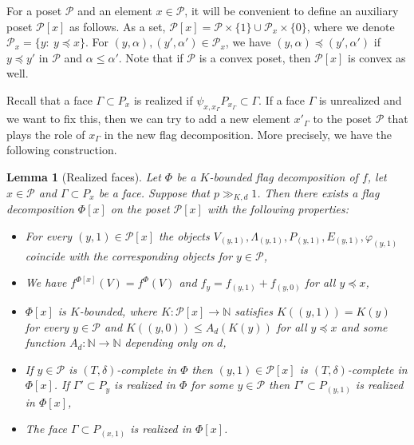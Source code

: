 \documentclass{daj}
\renewcommand{\le}{\leqslant}
\newcommand{\N}{\mathbb N}
\renewcommand{\P}{\mathcal P}
\newtheorem{lemma}[theorem]{Lemma}
\theoremstyle{definition}
\theoremstyle{remark}
\theoremstyle{definition}
\theoremstyle{definition}
\begin{document}
For a poset $\P$ and an element $x \in \P$, it will be convenient to define an auxiliary poset $\P[x]$ as follows. As a set, $\P[x] = \P \times \{1\} \cup \P_x \times \{0\}$, where we denote $\P_x = \{y: ~y \preceq x\}$. For $(y, \alpha), (y', \alpha') \in \P_x$, we have $(y, \alpha) \preceq (y', \alpha')$ if $y \preceq y'$ in $\P$ and $\alpha \le \alpha'$. Note that if $\P$ is a convex poset, then $\P[x]$ is convex as well. 





Recall that a face $\Gamma \subset P_x$ is realized if $\psi_{x, x_\Gamma} P_{x_\Gamma} \subset \Gamma$. If a face $\Gamma$ is unrealized and we want to fix this, then we can try to add a new element $x'_\Gamma$ to the poset $\P$ that plays the role of $x_\Gamma$ in the new flag decomposition. More precisely, we have the following construction.

\begin{lemma}[Realized faces]\label{oper1}
Let $\Phi$ be a $K$-bounded flag decomposition of $f$, let $x \in \P$ and $\Gamma \subset P_x$ be a face. Suppose that $p \gg_{K, d} 1$.
Then there exists a flag decomposition $\Phi[x]$ on the poset $\P[x]$ with the following properties:
\begin{itemize}
    \item For every $(y, 1) \in \P[x]$ the objects $V_{(y, 1)}, \Lambda_{(y, 1)}, P_{(y, 1)}, E_{(y, 1)}, \varphi_{(y, 1)}$ coincide with the corresponding objects for $y \in \P$,
    \item We have $f^{\Phi[x]}(V) = f^\Phi(V)$ and $f_y = f_{(y, 1)} + f_{(y, 0)}$ for all $y \preceq x$, 
    \item $\Phi[x]$ is $K$-bounded, where $K: \P[x] \rightarrow \N$ satisfies $K((y, 1)) = K(y)$ for every $y \in \P$ and $K((y, 0)) \le A_d(K(y))$ for all $y \preceq x$ and some function $A_d: \N\rightarrow \N$ depending only on $d$,
    \item If $y \in \P$ is $(T, \delta)$-complete in $\Phi$ then $(y, 1) \in \P[x]$ is $(T, \delta)$-complete in $\Phi[x]$. If $\Gamma' \subset P_y$ is realized in $\Phi$ for some $y \in \P$ then $\Gamma' \subset P_{(y, 1)}$ is realized in  $\Phi[x]$,
    \item The face $\Gamma \subset P_{(x,1)}$ is realized in $\Phi[x]$. 
\end{itemize}
\end{lemma}
\end{document}

